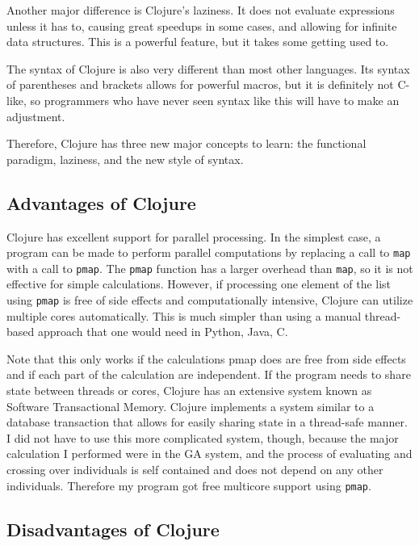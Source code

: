\documentclass{article}
\begin{document}
Another major difference is Clojure's laziness.  It does not evaluate
expressions unless it has to, causing great speedups in some cases, and allowing
for infinite data structures.  This is a powerful feature, but it takes some
getting used to.  

The syntax of Clojure is also very different than most other languages.  Its
syntax of parentheses and brackets allows for powerful macros, but it is
definitely not C-like, so programmers who have never seen syntax like this will
have to make an adjustment.

Therefore, Clojure has three new major concepts to learn: the functional
paradigm, laziness, and the new style of syntax.

\subsection{Advantages  of Clojure}

Clojure has excellent support for parallel processing.  In the simplest case, a
program can be made to perform parallel computations by replacing a call to
\texttt{map} with a call to \texttt{pmap}.  The \texttt{pmap} function has a
larger overhead than \texttt{map}, so it is not effective for simple
calculations.  However, if processing one element of the list using
\texttt{pmap} is free of side effects and computationally intensive, Clojure can
utilize multiple cores automatically.  This is much simpler than using a manual
thread-based approach that one would need in Python, Java, C.

Note that this only works if the calculations pmap does are free from side
effects and if each part of the calculation are independent.  If the program
needs to share state between threads or cores, Clojure has an extensive system
known as Software Transactional Memory.  Clojure implements a system similar to
a database transaction that allows for easily sharing state in a thread-safe
manner.  I did not have to use this more complicated system, though, because
the major calculation I performed were in the GA system, and the process of
evaluating and crossing over individuals is self contained and does not depend
on any other individuals.  Therefore my program got free multicore support
using \texttt{pmap}.

\subsection{Disadvantages of Clojure}
\end{document}
